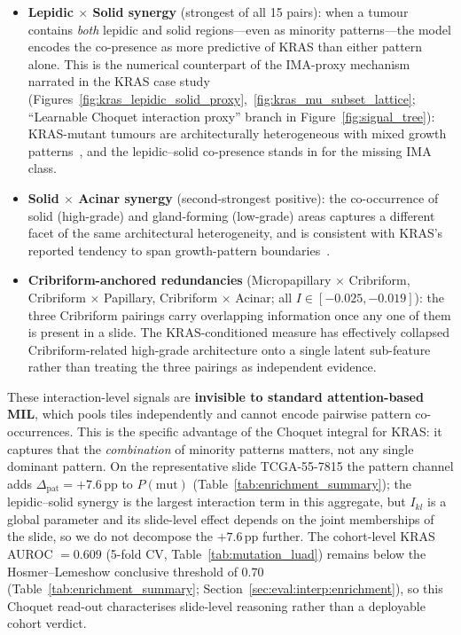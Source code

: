 \begin{itemize}
    \item \textbf{Lepidic $\times$ Solid synergy} (strongest of all
    15 pairs): when a tumour contains \emph{both} lepidic and solid
    regions---even as minority patterns---the model encodes the
    co-presence as more predictive of KRAS than either pattern
    alone.  This is the numerical counterpart of the IMA-proxy
    mechanism narrated in the KRAS case study
    (Figures~\ref{fig:kras_lepidic_solid_proxy},~\ref{fig:kras_mu_subset_lattice};
    ``Learnable Choquet interaction proxy'' branch in
    Figure~\ref{fig:signal_tree}): KRAS-mutant tumours are
    architecturally heterogeneous with mixed growth
    patterns~\cite{shim2015krasmucinous}, and the lepidic--solid
    co-presence stands in for the missing IMA class.

    \item \textbf{Solid $\times$ Acinar synergy} (second-strongest
    positive): the co-occurrence of solid (high-grade) and
    gland-forming (low-grade) areas captures a different facet of
    the same architectural heterogeneity, and is consistent with
    KRAS's reported tendency to span growth-pattern
    boundaries~\cite{shim2015krasmucinous}.

    \item \textbf{Cribriform-anchored redundancies} (Micropapillary
    $\times$ Cribriform, Cribriform $\times$ Papillary, Cribriform
    $\times$ Acinar; all $I \in [-0.025, -0.019]$): the three
    Cribriform pairings carry overlapping information once any one
    of them is present in a slide. The KRAS-conditioned measure
    has effectively collapsed Cribriform-related high-grade
    architecture onto a single latent sub-feature rather than
    treating the three pairings as independent evidence.
\end{itemize}

These interaction-level signals are \textbf{invisible to standard
attention-based MIL}, which pools tiles independently and cannot
encode pairwise pattern co-occurrences.
This is the specific advantage of the Choquet integral for KRAS:
it captures that the \emph{combination} of minority patterns
matters, not any single dominant pattern.
On the representative slide TCGA-55-7815 the pattern channel adds
$\Delta_{\mathrm{pat}} = +7.6$\,pp to $P(\mathrm{mut})$
(Table~\ref{tab:enrichment_summary}); the lepidic--solid synergy is
the largest interaction term in this aggregate, but $I_{kl}$ is a
global parameter and its slide-level effect depends on the joint
memberships of the slide, so we do not decompose the $+7.6$\,pp
further.
The cohort-level KRAS AUROC $= 0.609$ (5-fold CV,
Table~\ref{tab:mutation_luad}) remains below the Hosmer--Lemeshow
conclusive threshold of $0.70$
(Table~\ref{tab:enrichment_summary};
Section~\ref{sec:eval:interp:enrichment}), so this Choquet read-out
characterises slide-level reasoning rather than a deployable cohort
verdict.

